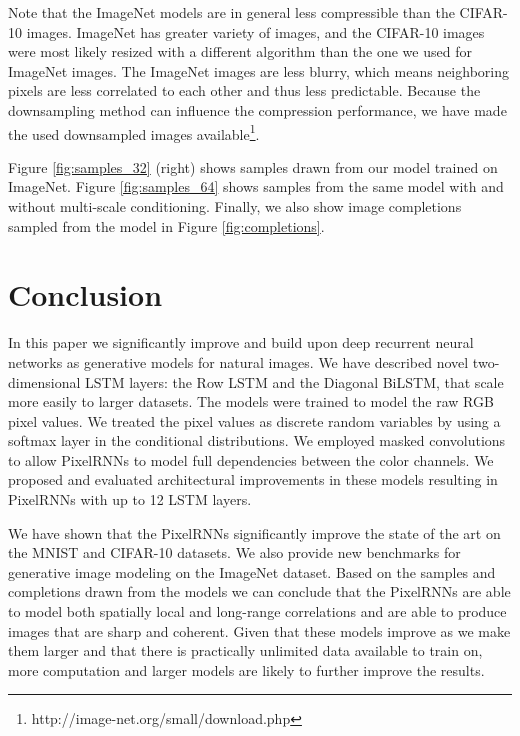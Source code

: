 \documentclass{article}
\begin{document}
Note that the ImageNet models are in general less compressible than the CIFAR-10 images. ImageNet has greater variety of images, and the CIFAR-10 images were most likely resized with a different algorithm than the one we used for ImageNet images. The ImageNet images are less blurry, which means neighboring pixels are less correlated to each other and thus less predictable. Because the downsampling method can influence the compression performance, we have made the used downsampled images available\footnote{http://image-net.org/small/download.php}.

Figure \ref{fig:samples_32} (right) shows  samples drawn from our model trained on ImageNet. Figure \ref{fig:samples_64} shows  samples from the same model with and without multi-scale conditioning. Finally, we also show image completions sampled from the model in Figure \ref{fig:completions}.






 

\section{Conclusion}

In this paper we significantly improve and build upon deep recurrent neural networks as generative models for natural images. We have described novel two-dimensional LSTM layers: the Row LSTM and the Diagonal BiLSTM, that scale more easily to larger datasets. The models were trained to model the raw RGB pixel values. We treated the pixel values as discrete random variables by using a softmax layer in the conditional distributions. We employed masked convolutions to allow PixelRNNs to model full dependencies between the color channels. We proposed and evaluated architectural improvements in these models resulting in PixelRNNs with up to 12 LSTM layers.

We have shown that the PixelRNNs significantly improve the state of the art on the MNIST and CIFAR-10 datasets. We also provide new benchmarks for generative image modeling on the ImageNet dataset. Based on the samples and completions drawn from the models we can conclude that the PixelRNNs are able to model both spatially local and long-range correlations and are able to produce images that are sharp and coherent.
Given that these models improve as we make them larger and that there is practically unlimited data available to train on, more computation and larger models are likely to further improve the results.
\end{document}
